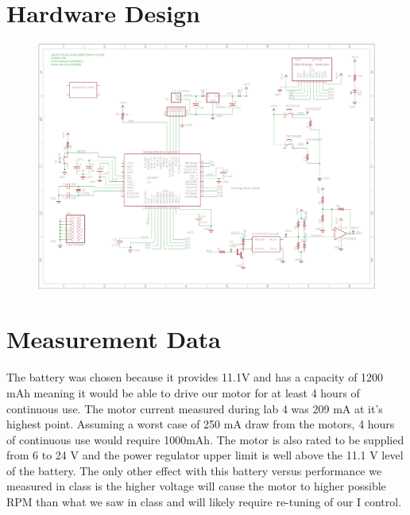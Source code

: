 \documentclass{article}
\begin{document}
\section{Hardware Design}
	
	
	\begin{figure}[h]
		\includegraphics[keepaspectratio, width = \textwidth]{Lab6Graphics/Lab6SChematic.png}
	\end{figure}
	

\section{Measurement Data}
	The battery was chosen because it provides 11.1V and has a capacity of 1200 mAh meaning it would be able to drive our motor for at least 4 hours of continuous use. The motor current measured during lab 4 was 209 mA at it's highest point. Assuming a worst case of 250 mA draw from the motors, 4 hours of continuous use would require 1000mAh. The motor is also rated to be supplied from 6 to 24 V and the power regulator upper limit is well above the 11.1 V level of the battery. The only other effect with this battery versus performance we measured in class is the higher voltage will cause the motor to higher possible RPM than what we saw in class and will likely require re-tuning of our I control.
\end{document}
